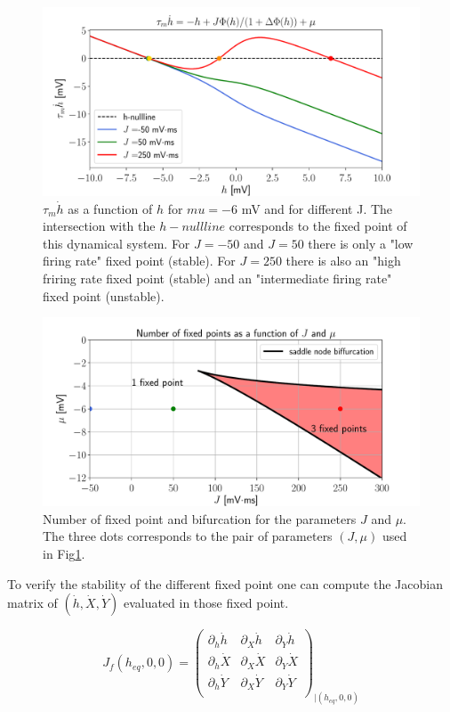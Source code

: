 \documentclass[12pt,twoside]{report}
\begin{document}
\begin{figure}[h!]
	\centering
	\includegraphics[width=0.8\linewidth]{hdyn.pdf}
	\caption{ $\tau_m \dot{h}$ as a function of $h$ for $mu=-6$ mV and for different J. The intersection with the $h-nullline$ corresponds to the fixed point of this dynamical system. For $J=-50$  and  $J=50$  there is only a  "low firing rate" fixed point (stable). For $J=250$ there is also an "high friring rate fixed point (stable) and an "intermediate firing rate" fixed point (unstable).
	}
	\label{fig:hdyn}
\end{figure}

\begin{figure}[h!]
	\centering
	\includegraphics[width=0.8\linewidth]{phase_plan.pdf}
	\caption{Number of fixed point and bifurcation for the parameters $J$ and $\mu$. The three dots corresponds to the pair of parameters $(J,\mu)$  used in Fig\ref{fig:hdyn}.
	}
	\label{fig:phase_plan}
\end{figure}


To verify the stability of the different fixed point one can compute the Jacobian  matrix of $(\dot{h},\dot{X},\dot{Y})$ evaluated in those fixed point.

\begin{equation}
J_f(h_{eq},0,0)=
\begin{pmatrix}
\partial_h \dot{h}  & \partial_X \dot{h} & \partial_Y \dot{h}  \\
\partial_h \dot{X}  & \partial_X \dot{X} & \partial_Y \dot{X}  \\
\partial_h \dot{Y}  & \partial_X \dot{Y} & \partial_Y \dot{Y}  \\
\end{pmatrix}_{|(h_{eq},0,0)}
\end{equation}
\end{document}
